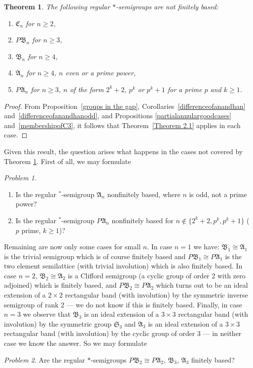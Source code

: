 \documentclass[preprint,1p,times]{elsarticle}
\numberwithin{equation}{section}
\newtheorem{Thm}{Theorem}[section]
\theoremstyle{remark}
\newtheorem{Problem}{Problem}[section]
\def\A{\mathfrak{A}}
\def\C{\mathfrak{C}}
\def\B{\mathfrak{B}}
\def\Sim{\mathfrak{S}}
\begin{document}
\begin{Thm}
\label{mainresultpartitionsemigroups} The following regular $*$-semigroups are not finitely based:
\begin{enumerate}
\item $\C_n$  for $n\ge 2$,
\item $P\B_n$ for $n\ge 3$,
\item $\B_n$ for $n\ge 4$,
\item $\A_n$ for $n\ge 4$, $n$ even or a prime power,
\item $P\A_n$ for $n\ge 3$, $n$ of the form $2^k+2$, $p^k$ or $p^k+1$ for
a  prime $p$ and $k\ge 1$.
\end{enumerate}
\end{Thm}

\begin{proof}
From Proposition~\ref{groups in the gap}, Corollaries~\ref{differenceofanandhan} and~\ref{differenceofanandhanodd}, and
Propositions \ref{partialannulargoodcases} and~\ref{membershipofC3}, it follows that Theorem~\ref{Theorem 2.1} applies
in each case.
\end{proof}

Given this result, the question arises what happens in the cases not covered by Theorem
\ref{mainresultpartitionsemigroups}. First of all, we may formulate
\begin{Problem}
\begin{enumerate}
\item  Is the regular $^*$-semigroup $\A_n$ nonfinitely based, where $n$ is odd, not a prime power?
\item Is the regular $^*$-semigroup $P\A_n$ nonfinitely based for $n\notin\{2^k+2,p^k,p^k+1\}$
($p$  prime, $k\ge 1$)?
\end{enumerate}
\end{Problem}

Remaining are now only some cases for small $n$. In case $n=1$ we have: $\B_1\cong \A_1$ is the trivial semigroup which is
of course finitely based and $P\B_1\cong P\A_1$ is the two element semilattice (with trivial involution) which is also
finitely based. In case $n=2$, $\B_2\cong \A_2$ is a Clifford semigroup (a cyclic group of order $2$ with zero
adjoined) which is finitely based, and $P\B_2\cong P\A_2$ which turns out to be an ideal extension of a $2\times 2$
rectangular band (with involution) by the symmetric inverse semigroup of rank 2 --- we do not know if this is finitely
based. Finally, in case $n=3$ we observe that $\B_3$ is an ideal extension of a $3\times 3$ rectangular band (with
involution) by the symmetric group $\Sim_3$ and $\A_3$ is an ideal extension of a $3\times 3$ rectangular band (with
involution) by the cyclic group of order $3$ --- in neither case we know the answer.  So we may formulate
\begin{Problem}
Are the regular $*$-semigroups $P\B_2\cong P\A_2$, $\B_3$, $\A_3$ finitely based?
\end{Problem}
\end{document}
